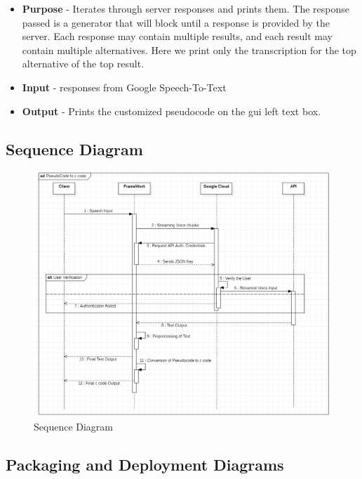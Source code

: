 \documentclass[12pt]{article}
\renewcommand{\thefigure}{\arabic{section}(\alph{figure})}
\renewcommand{\thefigure}{\arabic{section}.\arabic{subsection}(\alph{figure})}
\renewcommand{\thefigure}{\arabic{section}.\arabic{subsection}.\arabic{subsubsection}(\alph{figure})}
\newcounter{subsubsubsection}[subsubsection]
\begin{document}
\begin{itemize}
    \setlength{\itemsep}{1pt}
    \item \textbf{Purpose} - Iterates through server responses and prints them. The response passed is a generator that will block until a response is provided by the server. Each response may contain multiple results, and each result may contain multiple alternatives. Here we print only the transcription for the top alternative of the top result.
    \item \textbf{Input} - responses from Google Speech-To-Text
    \item \textbf{Output} - Prints the customized pseudocode on the gui left text box.
\end{itemize}

\subsection{Sequence Diagram}
\renewcommand{\thefigure}{\arabic{section}.\arabic{subsection}}

\begin{figure}[H]
{\centering
\centerline{
    \includegraphics[width=\textwidth]{SequenceDiag.png}
}
\caption{Sequence Diagram}
}
\end{figure}

\subsection{Packaging and Deployment Diagrams}
\renewcommand{\thefigure}{\arabic{section}.\arabic{subsection}}
\end{document}
